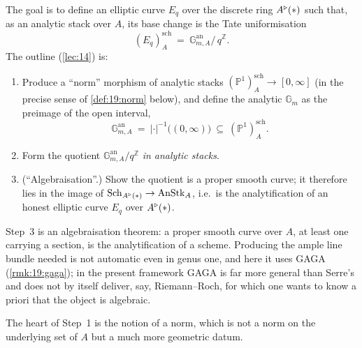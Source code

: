 \begin{remark}
\label{rmk:19:tate-goal}
The goal is to define an elliptic curve $E_q$ over the discrete ring $A^{\triangleright}(\ast)$
such that, as an analytic stack over $A$, its base change is the Tate uniformisation
\begin{equation*}
(E_q)^{\mathrm{sch}}_A\ =\ \mathbb{G}_{m,A}^{\mathrm{an}}\big/\,q^{\mathbb Z}.
\end{equation*}
The outline (\cref{lec:14}) is:
\begin{enumerate}
\item Produce a ``norm'' morphism of analytic stacks
$(\mathbb P^1)^{\mathrm{sch}}_A\to[0,\infty]$ (in the precise sense of
\cref{def:19:norm} below), and define the analytic $\mathbb G_m$ as the preimage
of the open interval,
\begin{equation*}
\mathbb{G}_{m,A}^{\mathrm{an}}\ =\ |\cdot|^{-1}\bigl((0,\infty)\bigr)\ \subseteq\ (\mathbb P^1)^{\mathrm{sch}}_A .
\end{equation*}
\item Form the quotient
$\mathbb{G}_{m,A}^{\mathrm{an}}/q^{\mathbb Z}$ \emph{in analytic stacks}.
\item (``Algebraisation''.) Show the quotient is a proper
smooth curve; it therefore lies in the image of
$\operatorname{Sch}_{A^{\triangleright}(\ast)}\to\operatorname{AnStk}_A$, i.e.\ is the analytification of an
honest elliptic curve $E_q$ over $A^{\triangleright}(\ast)$.
\end{enumerate}
\end{remark}

\begin{remark}
\label{rmk:19:algebraization}
Step~3 is an algebraisation theorem: a proper smooth curve over $A$, at least one
carrying a section, is the analytification of a scheme. Producing the ample line
bundle needed is not automatic even in genus one, and here it uses GAGA
(\cref{rmk:19:gaga}); in the present framework GAGA is far more general than
Serre's and does not by itself deliver, say, Riemann--Roch, for which one wants to
know a priori that the object is algebraic.
\end{remark}

The heart of Step~1 is the notion of a norm, which is not a norm on the
underlying set of $A$ but a much more geometric datum.

